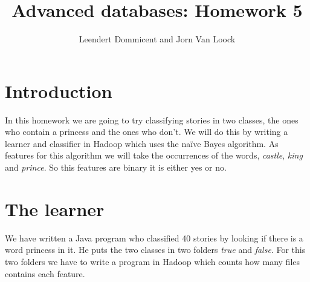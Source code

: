 \documentclass{article}
\title{Advanced databases: Homework 5}
\author{Leendert Dommicent and Jorn Van Loock}
\begin{document}
\maketitle
\setlength{\parskip}{4pt}
\setlength{\parindent}{0pt}
\section{Introduction}
In this homework we are going to try classifying stories in two classes, the ones who contain a princess and the ones who don't. We will do this by writing a learner and classifier in Hadoop which uses the na\"ive Bayes algorithm. As features for this algorithm we will take the occurrences of the words, \textit{castle}, \textit{king} and \textit{prince}. So this features are binary it is either yes or no.
\section{The learner}
We have written a Java program who classified 40 stories by looking if there is a word princess in it. He puts the two classes in two folders \textit{true} and \textit{false}. For this two folders we have to write a program in Hadoop which counts how many files contains each feature.
\end{document}
